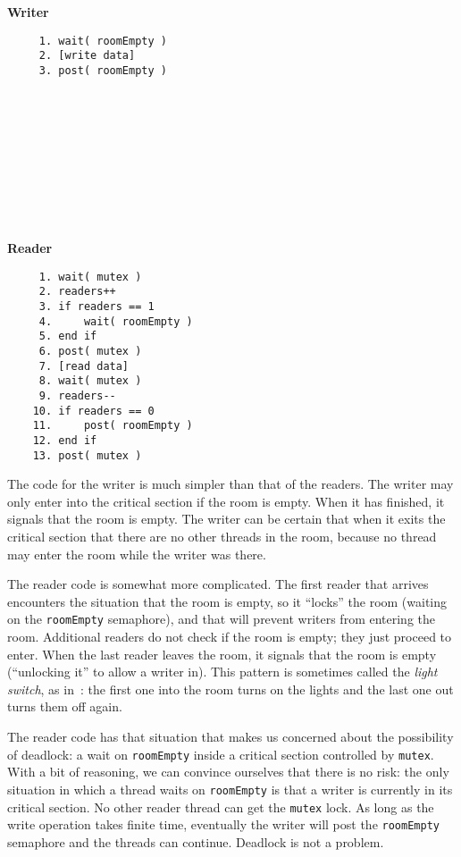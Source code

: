 \begin{multicols}{2}
\textbf{Writer}\vspace{-2em}
  \begin{verbatim}
	 1. wait( roomEmpty )
	 2. [write data]
	 3. post( roomEmpty )
	 
	 
	 
	 
	 
	 
	 
	 
	 
	 
  \end{verbatim}
\columnbreak
\textbf{Reader}\vspace{-2em}
  \begin{verbatim}
	 1. wait( mutex )
	 2. readers++
	 3. if readers == 1
	 4.     wait( roomEmpty )
	 5. end if
	 6. post( mutex )
	 7. [read data]
	 8. wait( mutex )
	 9. readers--
	10. if readers == 0
	11.     post( roomEmpty )
	12. end if
	13. post( mutex )
  \end{verbatim}
\end{multicols}
\vspace{-2em}

The code for the writer is much simpler than that of the readers. The writer may only enter into the critical section if the room is empty. When it has finished, it signals that the room is empty. The writer can be certain that when it exits the critical section that there are no other threads in the room, because no thread may enter the room while the writer was there.

The reader code is somewhat more complicated. The first reader that arrives encounters the situation that the room is empty, so it ``locks'' the room (waiting on the \texttt{roomEmpty} semaphore), and that will prevent writers from entering the room. Additional readers do not check if the room is empty; they just proceed to enter. When the last reader leaves the room, it signals that the room is empty (``unlocking it'' to allow a writer in). This pattern is sometimes called the \textit{light switch}, as in~\cite{mte241}: the first one into the room turns on the lights and the last one out turns them off again. 

The reader code has that situation that makes us concerned about the possibility of deadlock: a wait on \texttt{roomEmpty} inside a critical section controlled by \texttt{mutex}. With a bit of reasoning, we can convince ourselves that there is no risk: the only situation in which a thread waits on \texttt{roomEmpty} is that a writer is currently in its critical section. No other reader thread can get the \texttt{mutex} lock. As long as the write operation takes finite time, eventually the writer will post the \texttt{roomEmpty} semaphore and the threads can continue. Deadlock is not a problem.

